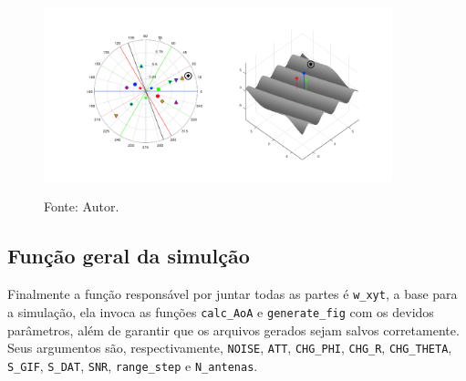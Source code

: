 \begin{figure}[htbp]
	\centering
	\caption{Exemplo de quadro da animação de saída da função \lstinline|generate_fig|.}
	\includegraphics[width=0.9\textwidth]{../pictures/simul_POLY_3_R_50.png}
	\label{fig:example:simul_POLY_3_R_50}
	\caption*{Fonte: Autor.}
\end{figure}

\subsection{Função geral da simulção}


Finalmente a função responsável por juntar todas as partes é \lstinline|w_xyt|, a base para a simulação, ela invoca as funções \lstinline|calc_AoA| e \lstinline|generate_fig| com os devidos parâmetros, além de garantir que os arquivos gerados sejam salvos corretamente.
Seus argumentos são, respectivamente, \lstinline|NOISE|, \lstinline|ATT|, \lstinline|CHG_PHI|, \lstinline|CHG_R|, \lstinline|CHG_THETA|, \lstinline|S_GIF|, \lstinline|S_DAT|, \lstinline|SNR|, \lstinline|range_step| e \lstinline|N_antenas|.



